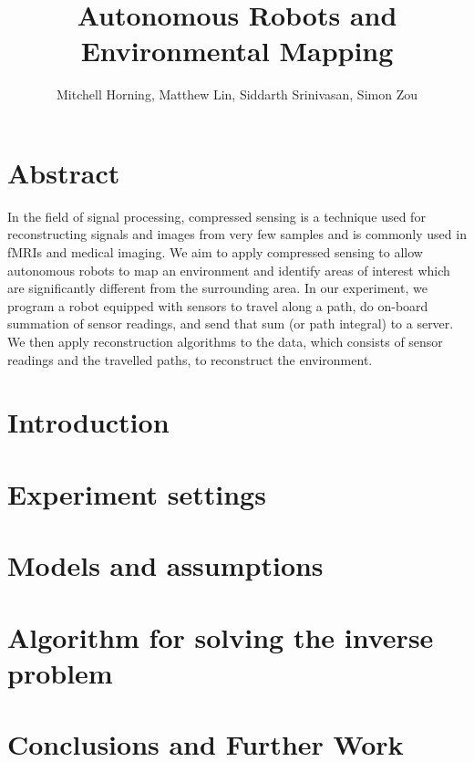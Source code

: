 \documentclass[english]{article}\usepackage[]{graphicx}\usepackage[]{color}
\begin{document}
\title{Autonomous Robots and Environmental Mapping}

\author{Mitchell Horning, Matthew Lin, Siddarth Srinivasan, Simon Zou}

\maketitle

\tableofcontents

\section{Abstract}

In the field of signal processing, compressed sensing is a technique used for 
reconstructing signals and images from very few samples and is commonly used in 
fMRIs and medical imaging. We aim to apply compressed sensing to allow 
autonomous robots to map an environment and identify areas of interest which 
are significantly different from the surrounding area. In our experiment, we 
program a robot equipped with sensors to travel along a path, do on-board 
summation of sensor readings, and send that sum (or path integral) to a 
server. We then apply reconstruction algorithms to the data, which consists of sensor readings 
and the travelled paths, to reconstruct the environment.

\section{Introduction}

\section{Experiment settings}

\section{Models and assumptions}

\section{Algorithm for solving the inverse problem}

\section{Conclusions and Further Work}
\end{document}

